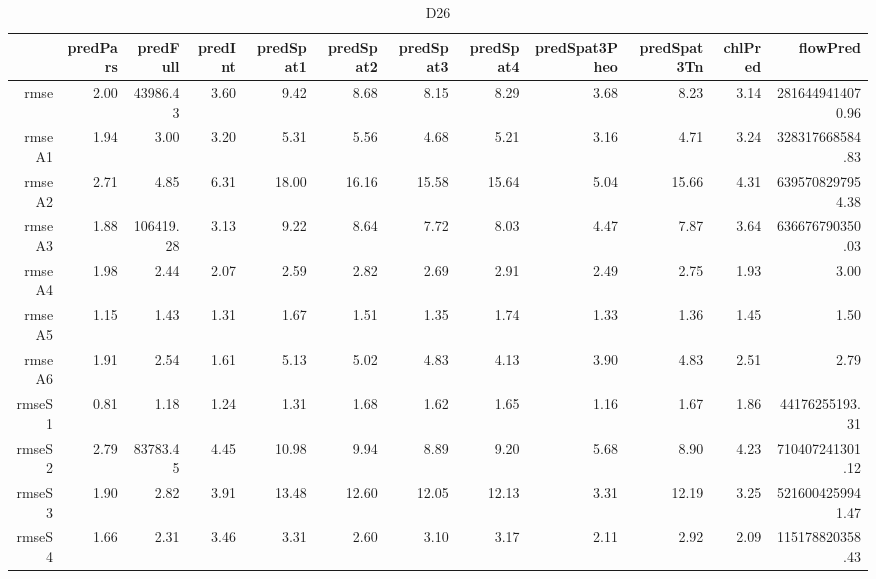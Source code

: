 \begin{table}[H]
\centering
\begingroup\fontsize{2.5pt}{4pt}\selectfont
\begin{tabular}{rrrrrrrrrrrr}
  \hline
 & predPars & predFull & predInt & predSpat1 & predSpat2 & predSpat3 & predSpat4 & predSpat3Pheo & predSpat3Tn & chlPred & flowPred \\ 
  \hline
rmse & 2.00 & 43986.43 & 3.60 & 9.42 & 8.68 & 8.15 & 8.29 & 3.68 & 8.23 & 3.14 & 2816449414070.96 \\ 
  rmseA1 & 1.94 & 3.00 & 3.20 & 5.31 & 5.56 & 4.68 & 5.21 & 3.16 & 4.71 & 3.24 & 328317668584.83 \\ 
  rmseA2 & 2.71 & 4.85 & 6.31 & 18.00 & 16.16 & 15.58 & 15.64 & 5.04 & 15.66 & 4.31 & 6395708297954.38 \\ 
  rmseA3 & 1.88 & 106419.28 & 3.13 & 9.22 & 8.64 & 7.72 & 8.03 & 4.47 & 7.87 & 3.64 & 636676790350.03 \\ 
  rmseA4 & 1.98 & 2.44 & 2.07 & 2.59 & 2.82 & 2.69 & 2.91 & 2.49 & 2.75 & 1.93 & 3.00 \\ 
  rmseA5 & 1.15 & 1.43 & 1.31 & 1.67 & 1.51 & 1.35 & 1.74 & 1.33 & 1.36 & 1.45 & 1.50 \\ 
  rmseA6 & 1.91 & 2.54 & 1.61 & 5.13 & 5.02 & 4.83 & 4.13 & 3.90 & 4.83 & 2.51 & 2.79 \\ 
  rmseS1 & 0.81 & 1.18 & 1.24 & 1.31 & 1.68 & 1.62 & 1.65 & 1.16 & 1.67 & 1.86 & 44176255193.31 \\ 
  rmseS2 & 2.79 & 83783.45 & 4.45 & 10.98 & 9.94 & 8.89 & 9.20 & 5.68 & 8.90 & 4.23 & 710407241301.12 \\ 
  rmseS3 & 1.90 & 2.82 & 3.91 & 13.48 & 12.60 & 12.05 & 12.13 & 3.31 & 12.19 & 3.25 & 5216004259941.47 \\ 
  rmseS4 & 1.66 & 2.31 & 3.46 & 3.31 & 2.60 & 3.10 & 3.17 & 2.11 & 2.92 & 2.09 & 115178820358.43 \\ 
   \hline
\end{tabular}
\endgroup
\caption{D26} 
\end{table}
